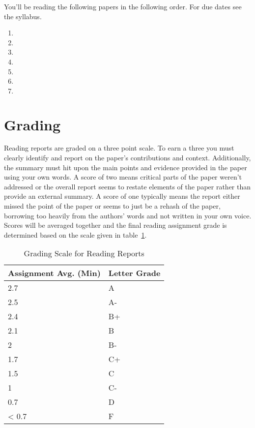 \documentclass[]{tufte-handout}
\begin{document}
You'll be reading the following papers in the following order. For due dates see the syllabus.

\begin{enumerate}
  \item {}
  \item {}
  \item {}
  \item {}
  \item {}
  \item {}
  \item {}
\end{enumerate}

\newpage

\section{Grading}

Reading reports are graded on a three point scale. To earn a three you must clearly identify and report on the paper's contributions and context.  Additionally, the summary must hit upon the main points and evidence provided in the paper using your own words.  A score of two means critical parts of the paper weren't addressed or the overall report seems to restate elements of the paper rather than provide an external summary.  A score of one typically means the report either missed the point of the paper or  seems to just be a rehash of the paper, borrowing too heavily from the authors' words and not written in your own voice. Scores will be averaged together and the final reading assignment grade is determined based on the scale given in table~\ref{scores}.

\begin{table}[!htbp]
\begin{center}
\begin{small}
\begin{tabular}{ll}
Assignment Avg. (Min) & Letter Grade \\ \toprule
2.7   & A  \\
2.5    & A- \\
2.4 & B+ \\
2.1    & B  \\
2   & B- \\
1.7    & C+ \\
1.5 & C  \\
1   & C- \\
0.7    & D  \\
< 0.7  & F
\end{tabular}
\end{small}
\end{center}
\caption{Grading Scale for Reading Reports}
\label{scores}
\end{table}


\end{document}
